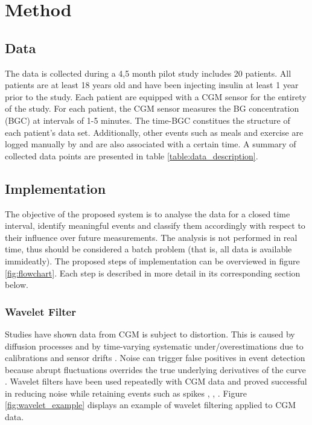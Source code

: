 \chapter{Method}

\section{Data}

The data is collected during a 4,5 month pilot study includes 20 patients.
All patients are at least 18 years old and have been injecting insulin at least 1 year prior to the study.
Each patient are equipped with a CGM sensor for the entirety of the study.
For each patient, the CGM sensor measures the BG concentration (BGC) at intervals of 1-5 minutes.
The time-BGC constitues the structure of each patient's data set.
Additionally, other events such as meals and exercise are logged manually by and are also associated with a certain time. A summary of collected data points are presented in table \ref{table:data_description}.



\section{Implementation}

The objective of the proposed system is to analyse the data for a closed time interval, identify meaningful events and classify them accordingly with respect to their influence over future measurements.
The analysis is not performed in real time, thus should be considered a batch problem (that is, all data is available immideatly).
The proposed steps of implementation can be overviewed in figure \ref{fig:flowchart}.
Each step is described in more detail in its corresponding section below.



\subsection{Wavelet Filter}

Studies have shown data from CGM is subject to distortion.
This is caused by diffusion processes and by time-varying systematic under/overestimations due to calibrations and sensor drifts \parencite{facchinetti2014modeling}.
Noise can trigger false positives in event detection because abrupt fluctuations overrides the true underlying derivatives of the curve \parencite{Facchinetti2016}.
Wavelet filters have been used repeatedly with CGM data and proved successful in reducing noise while retaining events such as spikes \parencite{Mag2016}, \parencite{Facchinetti2016}, \parencite{samadi2017}.
Figure \ref{fig:wavelet_example} displays an example of wavelet filtering applied to CGM data.

